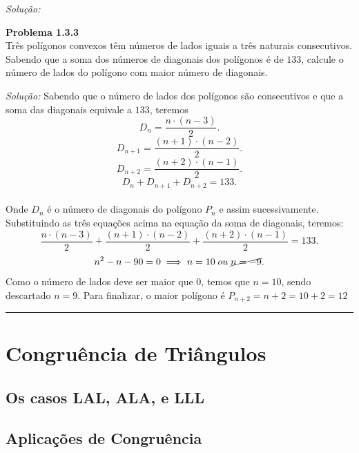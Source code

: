 \documentclass[a4paper, 11pt]{book}
\newenvironment{problem}[2][Problema] 
    { \begin{mdframed}[backgroundcolor=gray!20] \textbf{#1 #2} \\}
    {  \end{mdframed}}
\newenvironment{solution}
    {\textit{Solução:}}
    {}
\begin{document}
\begin{solution}
\begin{problem}{1.3.3}
    \label{prob:1.3.3}
    Três polígonos convexos têm números de lados iguais a três naturais consecutivos. Sabendo que a soma dos números de diagonais dos polígonos é de $133$, calcule o número de lados do polígono com maior número de diagonais.
\end{problem}
\begin{solution}
    Sabendo que o número de lados dos polígonos são consecutivos e que a soma das diagonais equivale a $133$, teremos
    \[
        D_{n} = \frac{n \cdot \left( n - 3 \right)}{2}
    .\] 
    \[
        D_{n + 1} = \frac{\left( n+1 \right)  \cdot \left( n - 2 \right)}{2}
    .\] 
    \[
        D_{n + 2} = \frac{\left( n+2 \right)  \cdot \left( n - 1 \right)}{2}
    .\] 
    \[
        D_{n} + D_{n+1} + D_{n+2} = 133
    .\] \\    
    Onde $D_{n}$ é o número de diagonais do polígono  $P_{n}$ e assim sucessivamente.
    Substituindo as três equações acima na equação da soma de diagonais, teremos:
    \[
    \frac{n \cdot \left( n - 3 \right)}{2} + \frac{\left( n+1 \right)  \cdot \left( n - 2 \right)}{2} + \frac{\left( n+2 \right)  \cdot \left( n - 1 \right)}{2} = 133
    .\] 
    \[
        n^2 - n - 90 = 0 \implies n = 10 \; ou \; \cancel{n = -9}
    .\] 
    Como o número de lados deve ser maior que 0, temos que $n = 10$, sendo descartado  $n = 9$.
    Para finalizar, o maior polígono é  $P_{n+2} = n + 2 = 10 + 2 = 12$
\end{solution}
\\\noindent\rule{7in}{2.8pt}

\chapter{Congruência de Triângulos}
\section{Os casos LAL, ALA, e LLL}


\section{Aplicações de Congruência}


\end{solution}
\end{document}
